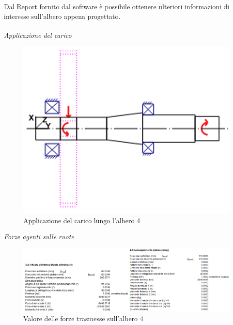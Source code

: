 Dal Report fornito dal software è possibile ottenere ulteriori informazioni di interesse sull'albero appena progettato. \\
\\
\emph{Applicazione del carico}
\begin{figure}[h]
    \centering
    \includegraphics[scale=0.50]{Immagini/CaricoAlbero4.png}
    \caption{Applicazione del carico lungo l'albero 4}
    \label{fig:CaricoAlbero4}
\end{figure}
\newpage
\emph{Forze agenti sulle ruote}
\begin{figure}[h]
    \centering
    \includegraphics[scale=0.5]{Immagini/ForzeRuoteAlbero4.png}
    \caption{Valore delle forze trasmesse sull'albero 4}
    \label{fig:ForzeRuoteAlbero4}
\end{figure}

